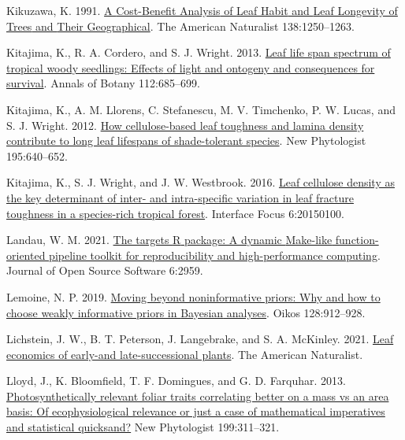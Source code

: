 \documentclass[
  12pt,
  letterpaper,
  DIV=11,
  numbers=noendperiod]{scrartcl}
\newlength{\cslhangindent}
\newlength{\cslentryspacingunit} %
\newenvironment{CSLReferences}[2] %
 {%
  \setlength{\parindent}{0pt}
  \ifodd #1
  \let\oldpar\par
  \def\par{\hangindent=\cslhangindent\oldpar}
  \fi
  \setlength{\parskip}{#2\cslentryspacingunit}
 }%
 {}
\begin{document}
\begin{CSLReferences}{1}{0}
\leavevmode{}%
Kikuzawa, K. 1991. \href{https://doi.org/10.2307/2462519}{A
{Cost-Benefit Analysis} of {Leaf Habit} and {Leaf Longevity} of {Trees}
and {Their Geographical}}. The American Naturalist 138:1250--1263.

\leavevmode{}%
Kitajima, K., R. A. Cordero, and S. J. Wright. 2013.
\href{https://doi.org/10.1093/aob/mct036}{Leaf life span spectrum of
tropical woody seedlings: {Effects} of light and ontogeny and
consequences for survival}. Annals of Botany 112:685--699.

\leavevmode{}%
Kitajima, K., A. M. Llorens, C. Stefanescu, M. V. Timchenko, P. W.
Lucas, and S. J. Wright. 2012.
\href{https://doi.org/10.1111/j.1469-8137.2012.04203.x}{How
cellulose-based leaf toughness and lamina density contribute to long
leaf lifespans of shade-tolerant species}. New Phytologist 195:640--652.

\leavevmode{}%
Kitajima, K., S. J. Wright, and J. W. Westbrook. 2016.
\href{https://doi.org/10.1098/rsfs.2015.0100}{Leaf cellulose density as
the key determinant of inter- and intra-specific variation in leaf
fracture toughness in a species-rich tropical forest}. Interface Focus
6:20150100.

\leavevmode{}%
Landau, W. M. 2021. \href{https://doi.org/10.21105/joss.02959}{The
targets {R} package: A dynamic {Make-like} function-oriented pipeline
toolkit for reproducibility and high-performance computing}. Journal of
Open Source Software 6:2959.

\leavevmode{}%
Lemoine, N. P. 2019. \href{https://doi.org/10.1111/oik.05985}{Moving
beyond noninformative priors: Why and how to choose weakly informative
priors in {Bayesian} analyses}. Oikos 128:912--928.

\leavevmode{}%
Lichstein, J. W., B. T. Peterson, J. Langebrake, and S. A. McKinley.
2021. \href{https://doi.org/10.1086/715453}{Leaf economics of early-and
late-successional plants}. The American Naturalist.

\leavevmode{}%
Lloyd, J., K. Bloomfield, T. F. Domingues, and G. D. Farquhar. 2013.
\href{https://doi.org/10.1111/nph.12281}{Photosynthetically relevant
foliar traits correlating better on a mass vs an area basis: {Of}
ecophysiological relevance or just a case of mathematical imperatives
and statistical quicksand?} New Phytologist 199:311--321.


\end{CSLReferences}
\end{document}
